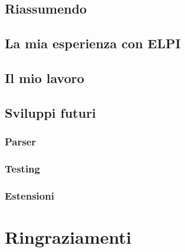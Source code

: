 \documentclass[12pt,a4paper,openright,twoside]{report}
\begin{document}

\section{Riassumendo}

\section{La mia esperienza con ELPI}

\section{Il mio lavoro}

\section{Sviluppi futuri}
\subsection{Parser}
\subsection{Testing}
\subsection{Estensioni}







\clearpage{\pagestyle{empty}\cleardoublepage}	%


\chapter*{Ringraziamenti}

\thispagestyle{empty}

\end{document}
